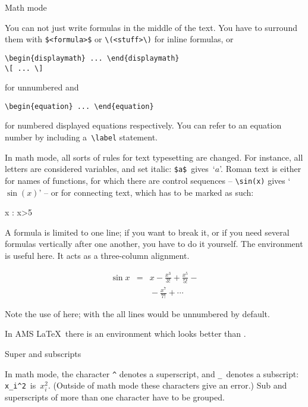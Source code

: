 {Math mode}

You can not just write formulas in the middle of the text. You have to
surround them with \verb+$<formula>$+ or \verb+\(<stuff>\)+ for
inline formulas, or
\begin{verbatim}
\begin{displaymath} ... \end{displaymath}
\[ ... \]
\end{verbatim}
for unnumbered and
\begin{verbatim}
\begin{equation} ... \end{equation}
\end{verbatim}
for numbered displayed equations respectively. You can refer to an
equation number by including a~\verb+\label+ statement.

In math mode, all sorts of rules for text typesetting are changed. For
instance, all letters are considered variables, and set italic:
\verb+$a$+~gives~`$a$'. Roman text is either for names of functions,
for which there are control sequences --
\verb+\sin(x)+ gives `$\sin(x)$' -- or for connecting text, which has
to be marked as such:
\begin{mathexamplewithcode}
\forall x \in {} 
\quad {} \quad: \qquad x>5
\end{mathexamplewithcode}

A formula is limited to one line; if you want to break it, or if you
need several formulas vertically after one another, you have to do it
yourself. The  environment is
useful here. It acts as a three-column alignment.
\begin{examplewithcode}
\begin{eqnarray}
\sin x&=&x-\frac{x^3}{3!}+\frac{x^5}{5!}- \nonumber \\ 
      &&{}-\frac{x^7}{7!}+\cdots
\end{eqnarray}
\end{examplewithcode}
Note the use of  here; with the  all
lines would be unnumbered by default.

In AMS \LaTeX\ there is an  environment which looks better
than .

 {Super and subscripts}

In math mode, the character \verb+^+ denotes a superscript, and
\verb+_+~denotes a subscript: \verb+x_i^2+~is~$x_i^2$. (Outside of
math mode these characters give an error.) Sub and superscripts of
more than one character have to be grouped.

